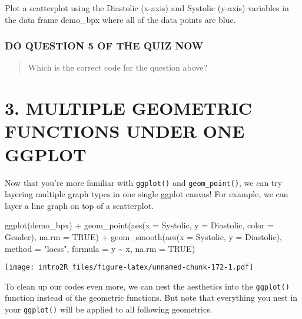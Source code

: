 \documentclass[
]{book}
\newenvironment{Shaded}{\begin{snugshade}}{\end{snugshade}}
\newcommand{\AttributeTok}[1]{\textcolor[rgb]{0.77,0.63,0.00}{#1}}
\newcommand{\ConstantTok}[1]{\textcolor[rgb]{0.00,0.00,0.00}{#1}}
\newcommand{\FunctionTok}[1]{\textcolor[rgb]{0.00,0.00,0.00}{#1}}
\newcommand{\NormalTok}[1]{#1}
\newcommand{\SpecialCharTok}[1]{\textcolor[rgb]{0.00,0.00,0.00}{#1}}
\newcommand{\StringTok}[1]{\textcolor[rgb]{0.31,0.60,0.02}{#1}}
\begin{document}
Plot a scatterplot using the Diastolic (x-axis) and Systolic (y-axis) variables in the data frame demo\_bpx where all of the data points are blue.

\hypertarget{do-question-5-of-the-quiz-now-2}{%
\subsubsection{DO QUESTION 5 OF THE QUIZ NOW}\label{do-question-5-of-the-quiz-now-2}}

\begin{quote}
Which is the correct code for the question above?
\end{quote}

\hypertarget{multiple-geometric-functions-under-one-ggplot}{%
\section{3. MULTIPLE GEOMETRIC FUNCTIONS UNDER ONE GGPLOT}\label{multiple-geometric-functions-under-one-ggplot}}

Now that you're more familiar with \texttt{ggplot()} and \texttt{geom\_point()}, we can try layering multiple graph types in one single ggplot canvas! For example, we can layer a line graph on top of a scatterplot.

\begin{Shaded}
\begin{Highlighting}[]
\FunctionTok{ggplot}\NormalTok{(demo\_bpx) }\SpecialCharTok{+}
  \FunctionTok{geom\_point}\NormalTok{(}\FunctionTok{aes}\NormalTok{(}\AttributeTok{x =}\NormalTok{ Systolic, }\AttributeTok{y =}\NormalTok{ Diastolic, }\AttributeTok{color =}\NormalTok{ Gender), }
             \AttributeTok{na.rm =} \ConstantTok{TRUE}\NormalTok{) }\SpecialCharTok{+}
  \FunctionTok{geom\_smooth}\NormalTok{(}\FunctionTok{aes}\NormalTok{(}\AttributeTok{x =}\NormalTok{ Systolic, }\AttributeTok{y =}\NormalTok{ Diastolic), }
              \AttributeTok{method =} \StringTok{"loess"}\NormalTok{, }
              \AttributeTok{formula =}\NormalTok{ y }\SpecialCharTok{\textasciitilde{}}\NormalTok{ x, }
              \AttributeTok{na.rm =} \ConstantTok{TRUE}\NormalTok{)}
\end{Highlighting}
\end{Shaded}

\texttt{[image: intro2R\_files/figure-latex/unnamed-chunk-172-1.pdf]}

To clean up our codes even more, we can nest the aesthetics into the \texttt{ggplot()} function instead of the geometric functions. But note that everything you nest in your \texttt{ggplot()} will be applied to all following geometrics.
\end{document}
